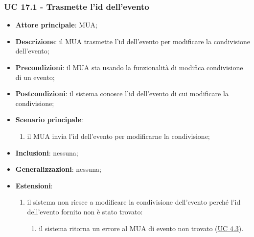     \subsubsection{UC 17.1 - Trasmette l'id dell'evento} \label{sec:UC17.1}
    \begin{itemize}
        \item \textbf{Attore principale}: MUA;
        \item \textbf{Descrizione}: il MUA trasmette l'id dell'evento per modificare la condivisione dell'evento;
        \item \textbf{Precondizioni}: il MUA sta usando la funzionalità di modifica condivisione di un evento;
        \item \textbf{Postcondizioni}: il sistema conosce l'id dell'evento di cui modificare la condivisione;
        \item \textbf{Scenario principale}:
            \begin{enumerate}
                \item il MUA invia l'id dell'evento per modificarne la condivisione;
            \end{enumerate}
        \item \textbf{Inclusioni}: nessuna;
        \item \textbf{Generalizzazioni}: nessuna;
        \item \textbf{Estensioni}:
            \begin{enumerate}[label=\alph*.]
                \item il sistema non riesce a modificare la condivisione dell'evento perché l'id dell'evento fornito non è stato trovato:
                \begin{enumerate}[label=\arabic*.]
                    \item il sistema ritorna un errore al MUA di evento non trovato (\hyperref[sec:UC4.3]{UC 4.3}).
                \end{enumerate}
            \end{enumerate}
    \end{itemize}


